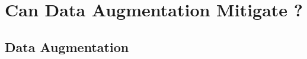 \section{Can Data Augmentation Mitigate \pb?}
\label{sec:da}


\subsection{Data Augmentation}
\label{subsec:our_bl}






